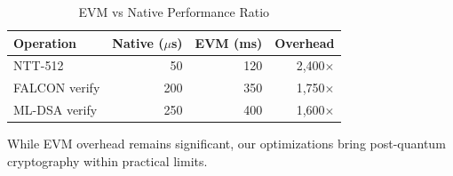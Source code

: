 \begin{table}[h]
\centering
\caption{EVM vs Native Performance Ratio}
\begin{tabular}{lrrr}
\toprule
Operation & Native ($\mu$s) & EVM (ms) & Overhead \\
\midrule
NTT-512 & 50 & 120 & 2,400$\times$ \\
FALCON verify & 200 & 350 & 1,750$\times$ \\
ML-DSA verify & 250 & 400 & 1,600$\times$ \\
\bottomrule
\end{tabular}
\end{table}

While EVM overhead remains significant, our optimizations bring post-quantum cryptography within practical limits.


